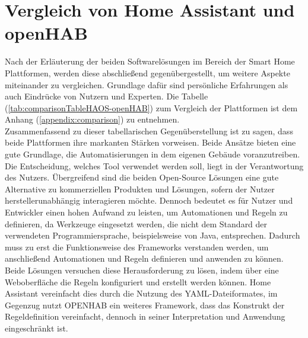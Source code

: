 \section{Vergleich von Home Assistant und openHAB}
\label{sec:comparison-HAOS-openHAB}
    Nach der Erläuterung der beiden Softwarelösungen im Bereich der Smart Home Plattformen, werden diese abschließend 
    gegenübergestellt, um weitere Aspekte miteinander zu vergleichen. Grundlage dafür sind persönliche Erfahrungen als auch 
    Eindrücke von Nutzern und Experten. Die Tabelle (\ref{tab:comparisonTableHAOS-openHAB}) zum Vergleich 
    der Plattformen ist dem Anhang (\ref{appendix:comparison}) zu entnehmen.
    \\
    \linebreak
    Zusammenfassend zu dieser tabellarischen Gegenüberstellung ist zu sagen, dass beide Plattformen ihre markanten Stärken vorweisen. 
    Beide Ansätze bieten eine gute Grundlage, die Automatisierungen in dem eigenen Gebäude voranzutreiben. Die Entscheidung, welches 
    Tool verwendet werden soll, liegt in der Verantwortung des Nutzers. Übergreifend sind die beiden Open-Source Lösungen eine gute 
    Alternative zu kommerziellen Produkten und Lösungen, sofern der Nutzer herstellerunabhängig interagieren möchte. Dennoch 
    bedeutet es für Nutzer und Entwickler einen hohen Aufwand zu leisten, um Automationen und Regeln zu definieren, da 
    Werkzeuge eingesetzt werden, die nicht dem Standard der verwendeten Programmiersprache, beispielsweise von Java, 
    entsprechen. Dadurch muss zu erst die Funktionsweise des Frameworks verstanden werden, um anschließend Automationen und 
    Regeln definieren und anwenden zu können. Beide Lösungen versuchen diese Herausforderung zu lösen, indem über eine Weboberfläche 
    die Regeln konfiguriert und erstellt werden können. Home Assistant vereinfacht dies durch die Nutzung des YAML-Dateiformates, im 
    Gegenzug nutzt \acs{OPENHAB} ein weiteres Framework, dass das Konstrukt der Regeldefinition vereinfacht, dennoch in seiner Interpretation 
    und Anwendung eingeschränkt ist.
